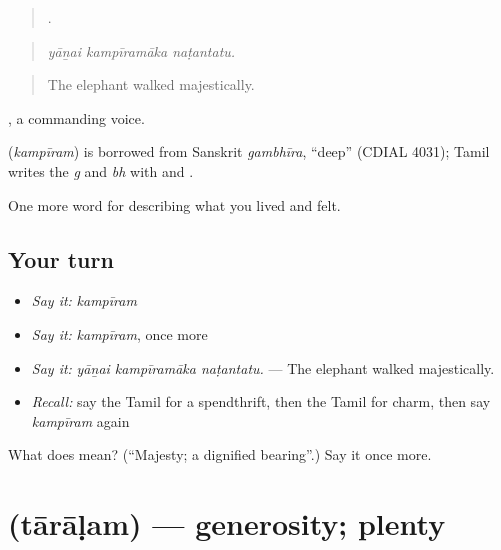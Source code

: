 \begin{quote}
  .
\end{quote}

\begin{quote}
\emph{yāṉai kampīramāka naṭantatu.}
\end{quote}

\begin{quote}
The elephant walked majestically.
\end{quote}

 , a commanding voice.

\begin{cousinweb}
\textbf{} (\emph{kampīram}) is borrowed from Sanskrit \emph{gambhīra}, \textquotedblleft{}deep\textquotedblright{} (CDIAL 4031); Tamil writes the \emph{g} and \emph{bh} with  and .
\end{cousinweb}

\begin{grammarlens}[title={What you've built}]
One more word for describing what you lived and felt.
\end{grammarlens}

\subsection*{Your turn}
\begin{itemize}
\raggedright
  \item \emph{Say it:} \emph{kampīram}
  \item \emph{Say it:} \emph{kampīram}, once more
  \item \emph{Say it:} \emph{yāṉai kampīramāka naṭantatu.} — The elephant walked majestically.
  \item \emph{Recall:} say the Tamil for a spendthrift, then the Tamil for charm, then say \emph{kampīram} again
\end{itemize}

\begin{tcolorbox}[breakable,colback=teal!4,colframe=teal!35!black,title={Before you move on}]
What does  mean? (\textquotedblleft{}Majesty; a dignified bearing\textquotedblright{}.) Say it once more.
\end{tcolorbox}
\section[\texorpdfstring{\ta{தாராளம்} (tārāḷam)}{தாராளம் (tārāḷam)}]{ (tārāḷam) — generosity; plenty}

